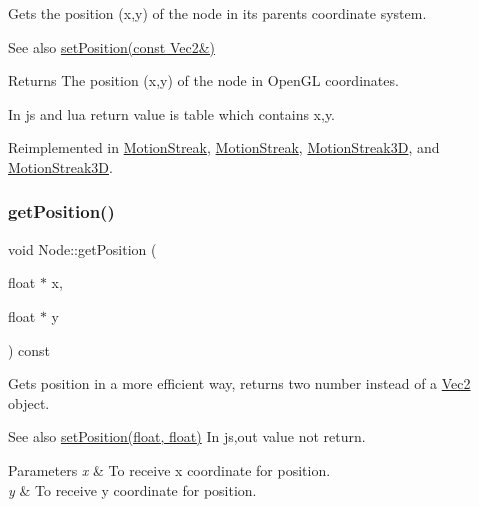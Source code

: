 Gets the position (x,y) of the node in its parent\textquotesingle{}s coordinate system.

\begin{DoxySeeAlso}{See also}
\hyperlink{classNode_a8ffbf25763ef5f15eeae7227779505bc}{set\+Position(const Vec2\&)}
\end{DoxySeeAlso}
\begin{DoxyReturn}{Returns}
The position (x,y) of the node in Open\+GL coordinates. 
\begin{DoxyCode}
In js and lua \textcolor{keywordflow}{return} value is table which contains x,y.
\end{DoxyCode}
 
\end{DoxyReturn}


Reimplemented in \hyperlink{classMotionStreak_a73f3dcb75380855a39c6ff9eee475d80}{Motion\+Streak}, \hyperlink{classMotionStreak_ae5dbfd01e4931044ac764dd43c6fbf30}{Motion\+Streak}, \hyperlink{classMotionStreak3D_a17b236b952ac5670676b2b50a0fab421}{Motion\+Streak3D}, and \hyperlink{classMotionStreak3D_a5c9d70a707ecdaf49d8793ae6e4bce7e}{Motion\+Streak3D}.

\mbox{\label{classNode_a216f30e9a2dda896b2ffff1885b33a98}} 
\subsubsection{\texorpdfstring{get\+Position()}{getPosition()}\hspace{0.1cm}{\footnotesize\ttfamily [3/4]}}
{\footnotesize\ttfamily void Node\+::get\+Position (\begin{DoxyParamCaption}\item[{float $\ast$}]{x,  }\item[{float $\ast$}]{y }\end{DoxyParamCaption}) const\hspace{0.3cm}{\ttfamily [virtual]}}

Gets position in a more efficient way, returns two number instead of a \hyperlink{classVec2}{Vec2} object.

\begin{DoxySeeAlso}{See also}
{\ttfamily \hyperlink{classNode_aaa8545c103ef1b35e5076dbedab93af5}{set\+Position(float, float)}} In js,out value not return.
\end{DoxySeeAlso}

\begin{DoxyParams}{Parameters}
{\em x} & To receive x coordinate for position. \\
\hline
{\em y} & To receive y coordinate for position. \\
\hline
\end{DoxyParams}


